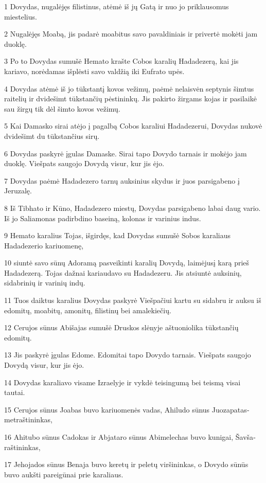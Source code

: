 \par 1 Dovydas, nugalėjęs filistinus, atėmė iš jų Gatą ir nuo jo priklausomus miestelius. 
\par 2 Nugalėjęs Moabą, jis padarė moabitus savo pavaldiniais ir privertė mokėti jam duoklę. 
\par 3 Po to Dovydas sumušė Hemato krašte Cobos karalių Hadadezerą, kai jis kariavo, norėdamas išplėsti savo valdžią iki Eufrato upės. 
\par 4 Dovydas atėmė iš jo tūkstantį kovos vežimų, paėmė nelaisvėn septynis šimtus raitelių ir dvidešimt tūkstančių pėstininkų. Jis pakirto žirgams kojas ir pasilaikė sau žirgų tik dėl šimto kovos vežimų. 
\par 5 Kai Damasko sirai atėjo į pagalbą Cobos karaliui Hadadezerui, Dovydas nukovė dvidešimt du tūkstančius sirų. 
\par 6 Dovydas paskyrė įgulas Damaske. Sirai tapo Dovydo tarnais ir mokėjo jam duoklę. Viešpats saugojo Dovydą visur, kur jis ėjo. 
\par 7 Dovydas paėmė Hadadezero tarnų auksinius skydus ir juos parsigabeno į Jeruzalę. 
\par 8 Iš Tibhato ir Kūno, Hadadezero miestų, Dovydas parsigabeno labai daug vario. Iš jo Saliamonas padirbdino baseiną, kolonas ir varinius indus. 
\par 9 Hemato karalius Tojas, išgirdęs, kad Dovydas sumušė Sobos karaliaus Hadadezerio kariuomenę, 
\par 10 siuntė savo sūnų Adoramą pasveikinti karalių Dovydą, laimėjusį karą prieš Hadadezerą. Tojas dažnai kariaudavo su Hadadezeru. Jis atsiuntė auksinių, sidabrinių ir varinių indų. 
\par 11 Tuos daiktus karalius Dovydas paskyrė Viešpačiui kartu su sidabru ir auksu iš edomitų, moabitų, amonitų, filistinų bei amalekiečių. 
\par 12 Cerujos sūnus Abišajas sumušė Druskos slėnyje aštuoniolika tūkstančių edomitų. 
\par 13 Jis paskyrė įgulas Edome. Edomitai tapo Dovydo tarnais. Viešpats saugojo Dovydą visur, kur jis ėjo. 
\par 14 Dovydas karaliavo visame Izraelyje ir vykdė teisingumą bei teismą visai tautai. 
\par 15 Cerujos sūnus Joabas buvo kariuomenės vadas, Ahiludo sūnus Juozapatas­metraštininkas, 
\par 16 Ahitubo sūnus Cadokas ir Abjataro sūnus Abimelechas buvo kunigai, Šavša­raštininkas, 
\par 17 Jehojados sūnus Benaja buvo keretų ir peletų viršininkas, o Dovydo sūnūs buvo aukšti pareigūnai prie karaliaus.



